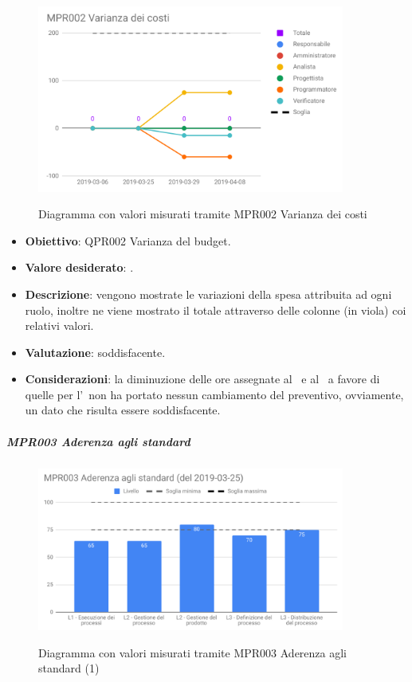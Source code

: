 	\begin{figure}[H]
		\centering
		\includegraphics[width=0.9\textwidth]{img/cruscotti/RQ/MPR002.png}
		\label{immagineVarianzaCostiRP}
		\caption{Diagramma con valori misurati tramite MPR002 Varianza dei costi}
	\end{figure}
	
	\begin{itemize}
		\item \textbf{Obiettivo}: QPR002 Varianza del budget.
		\item \textbf{Valore desiderato}: .
		\item \textbf{Descrizione}: vengono mostrate le variazioni della spesa attribuita ad ogni ruolo, inoltre ne viene mostrato il totale attraverso delle colonne (in viola) coi relativi valori.
		\item \textbf{Valutazione}: soddisfacente.
		\item \textbf{Considerazioni}: la diminuzione delle ore assegnate al \Progr\ e al \Ver\ a favore di quelle per l'\Ana\, non ha portato nessun cambiamento del preventivo, ovviamente, un dato che
		risulta essere soddisfacente.
	\end{itemize}

	\subparagraph{MPR003 Aderenza agli standard}
	
	\begin{figure}[H]
		\centering
		\includegraphics[width=0.9\textwidth]{img/cruscotti/RQ/MPR003(1).png}
		\label{immagineAderenzaStandard1RP}
		\caption{Diagramma con valori misurati tramite MPR003 Aderenza agli standard (1)}
	\end{figure}
	
